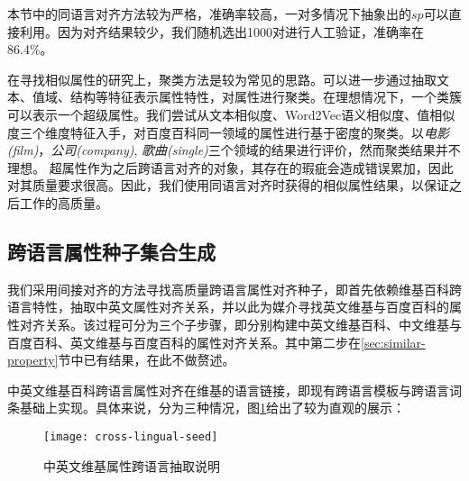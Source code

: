 本节中的同语言对齐方法较为严格，准确率较高，一对多情况下抽象出的$sp$可以直接利用。因为对齐结果较少，我们随机选出1000对进行人工验证，准确率在86.4\%。

在寻找相似属性的研究上，聚类方法是较为常见的思路。可以进一步通过抽取文本、值域、结构等特征表示属性特性，对属性进行聚类。在理想情况下，一个类簇可以表示一个超级属性。我们尝试从文本相似度、Word2Vec语义相似度、值相似度三个维度特征入手，对百度百科同一领域的属性进行基于密度的聚类。以\textit{电影(film)}，\textit{公司(company)}, \textit{歌曲(single)}三个领域的结果进行评价，然而聚类结果并不理想。
超属性作为之后跨语言对齐的对象，其存在的瑕疵会造成错误累加，因此对其质量要求很高。因此，我们使用同语言对齐时获得的相似属性结果，以保证之后工作的高质量。

\subsection{跨语言属性种子集合生成}
\label{sec:cross-lingual-seed}
我们采用间接对齐的方法寻找高质量跨语言属性对齐种子，即首先依赖维基百科跨语言特性，抽取中英文属性对齐关系，并以此为媒介寻找英文维基与百度百科的属性对齐关系。该过程可分为三个子步骤，即分别构建中英文维基百科、中文维基与百度百科、英文维基与百度百科的属性对齐关系。其中第二步在\ref{sec:similar-property}节中已有结果，在此不做赘述。

{\heiti 中英文维基百科跨语言属性对齐}在维基的语言链接，即现有跨语言模板与跨语言词条基础上实现。具体来说，分为三种情况，图\ref{fig:cross-lingual-seed}给出了较为直观的展示：

\begin{figure}[h]
  \centering
    \texttt{[image: cross-lingual-seed]}
  \caption{中英文维基属性跨语言抽取说明}
  \label{fig:cross-lingual-seed}
\end{figure}

